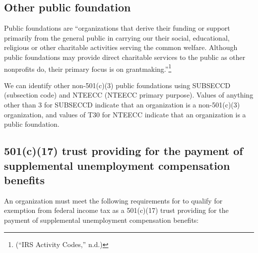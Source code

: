 \documentclass[
  letterpaper,
  DIV=11,
  numbers=noendperiod]{scrreprt}
\begin{document}
\hypertarget{other-public-foundation}{%
\subsection{Other public foundation}\label{other-public-foundation}}

Public foundations are ``organizations that derive their funding or
support primarily from the general public in carrying our their social,
educational, religious or other charitable activities serving the common
welfare. Although public foundations may provide direct charitable
services to the public as other nonprofits do, their primary focus is on
grantmaking.''\footnote{({``IRS Activity Codes,''} n.d.)}

We can identify other non-501(c)(3) public foundations using SUBSECCD
(subsection code) and NTEECC (NTEECC primary purpose). Values of
anything other than 3 for SUBSECCD indicate that an organization is a
non-501(c)(3) organization, and values of T30 for NTEECC indicate that
an organization is a public foundation.

\hypertarget{c17-trust-providing-for-the-payment-of-supplemental-unemployment-compensation-benefits}{%
\subsection{501(c)(17) trust providing for the payment of supplemental
unemployment compensation
benefits}\label{c17-trust-providing-for-the-payment-of-supplemental-unemployment-compensation-benefits}}

An organization must meet the following requirements for to qualify for
exemption from federal income tax as a 501(c)(17) trust providing for
the payment of supplemental unemployment compensation benefits:
\end{document}
